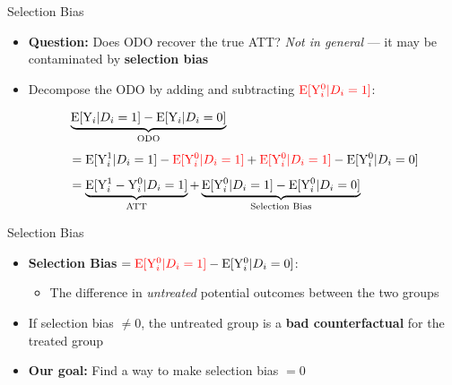 \documentclass[hyperref={pdfpagelabels=false}]{beamer}
\begin{document}
\begin{frame}{Selection Bias}
	\begin{itemize}

        \item \textbf{Question:} Does ODO recover the true ATT? \emph{Not in general} --- it may be contaminated by \textbf{selection bias}
        		\vspace{0.2cm}

        
        \item Decompose the ODO by adding and subtracting ${\color{red}\mathrm{E}[\mathrm{Y}^{0}_{i}|D_i=1]}$:
                		\vspace{0.2cm}

	\begin{equation*}
		\begin{aligned}
			&\underbrace{\mathrm{E}[\mathrm{Y}_{i}|D_i=1] - \mathrm{E}[\mathrm{Y}_{i}|D_i=0]}_{\text{ODO}} \\[4pt]
			&= \mathrm{E}[\mathrm{Y}^{1}_{i}|D_i=1]-{\color{red}\mathrm{E}[\mathrm{Y}^{0}_{i}|D_i=1]}+{\color{red}\mathrm{E}[\mathrm{Y}^{0}_{i}|D_i=1]}-\mathrm{E}[\mathrm{Y}^{0}_{i}|D_i=0] \\[4pt]
			&= \underbrace{\mathrm{E}[\mathrm{Y}^{1}_{i}-\mathrm{Y}^{0}_{i}|D_i=1]}_{\text{ATT}} + \underbrace{\mathrm{E}[\mathrm{Y}^{0}_{i}|D_i=1]-\mathrm{E}[\mathrm{Y}^{0}_{i}|D_i=0]}_{\text{Selection Bias}}
		\end{aligned}
	\end{equation*}
	
	\end{itemize}
\end{frame}



\begin{frame}{Selection Bias}
	\begin{itemize}
		
     
		\item \textbf{Selection Bias} $= {\color{red}\mathrm{E}[\mathrm{Y}^{0}_{i}|D_i=1]} - \mathrm{E}[\mathrm{Y}^{0}_{i}|D_i=0]$: 
		\vspace{0.2cm}
        	\begin{itemize}
        \item The difference in \emph{untreated} potential outcomes between the two groups
		\vspace{0.1cm}
        	\end{itemize}

		\item If selection bias $\neq 0$, the untreated group is a \textbf{bad counterfactual} for the treated group
		\vspace{0.2cm}
		\item \textbf{Our goal:} Find a way to make selection bias $= 0$
	\end{itemize}
\end{frame}
\end{document}
